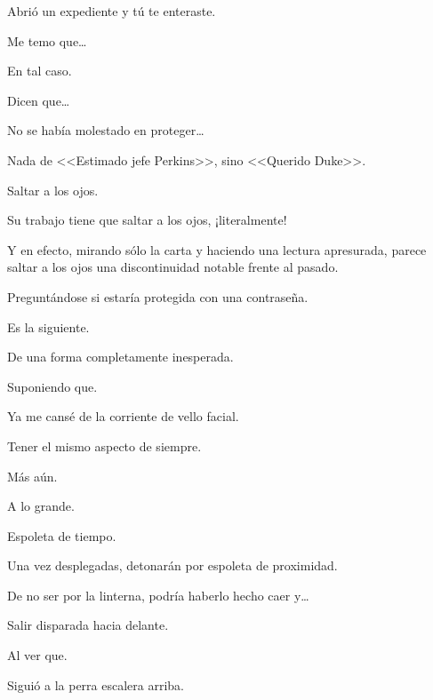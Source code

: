 \sk
Abrió un expediente y tú te enteraste. 

\sk
Me temo que\ldots{} 

\sk
En tal caso. 

\sk
Dicen que\ldots{} 

\sk
No se había molestado en proteger\ldots{} 

\sk
Nada de <<Estimado jefe Perkins>>, sino <<Querido Duke>>.\nb{}

\sk
Saltar a los ojos. 

\sk
Su trabajo tiene que saltar a los ojos, ¡literalmente! 

\sk
Y en efecto, mirando sólo la carta y haciendo una lectura apresurada, parece saltar a los ojos una discontinuidad notable frente al pasado. 

\sk
Preguntándose si estaría protegida con una contraseña.\nb{}

\sk
Es la siguiente. 

\sk
De una forma completamente inesperada. \nb{}

\sk
Suponiendo que. 

\sk
Ya me cansé de la corriente de vello facial. 

\sk
Tener el mismo aspecto de siempre. 

\sk
Más aún. 

\sk
A lo grande. 

\sk
Espoleta de tiempo. 

\sk
Una vez desplegadas, detonarán por espoleta de proximidad. 

\sk
De no ser por la linterna, podría haberlo hecho caer y\ldots{} 

\sk
Salir disparada hacia delante. 

\sk
Al ver que. 

\sk
Siguió a la perra escalera arriba. 

